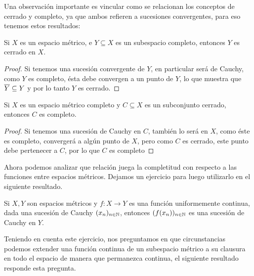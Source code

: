 \documentclass[12pt,a4paper]{book}
\begin{document}
Una observación importante es vincular como se relacionan los conceptos de cerrado y completo, ya que ambos refieren a sucesiones convergentes, para eso tenemos estos resultados:
\begin{prop}
Si $X$ es un espacio métrico, e $Y \subseteq X$ es un subespacio completo, entonces $Y$ es cerrado en $X$.
\begin{proof}
Si tenemos una sucesión convergente de $Y$, en particular será de Cauchy, como $Y$ es completo, ésta debe convergen a un punto de $Y$, lo que muestra que $\overline{Y} \subseteq Y$ y por lo tanto $Y$ es cerrado.
\end{proof}
\end{prop}
\begin{prop}
Si $X$ es un espacio métrico completo y $C \subseteq X$ es un subconjunto cerrado, entonces $C$ es completo.
\begin{proof}
Si tenemos una sucesión de Cauchy en $C$, también lo será en $X$, como éste es completo, convergerá a algún punto de $X$, pero como $C$ es cerrado, este punto debe pertenecer a $C$, por lo que $C$ es completo
\end{proof}
\end{prop}
Ahora podemos analizar que relación juega la completitud con respecto a las funciones entre espacios métricos. Dejamos un ejercicio para luego utilizarlo en el siguiente resultado.
\begin{ej}
Si $X,Y$ son espacios métricos y $f:X \rightarrow Y$ es una función uniformemente continua, dada una sucesión de Cauchy $(x_n)_{{n} \in \mathbb{N}}$, entonces $(f(x_n))_{{n} \in \mathbb{N}}$ es una sucesión de Cauchy en $Y$.
\end{ej}
Teniendo en cuenta este ejercicio, nos preguntamos en que circunstancias podemos extender una función continua de un subespacio métrico a su clausura en todo el espacio de manera que permanezca continua, el siguiente resultado responde esta pregunta.
\end{document}
